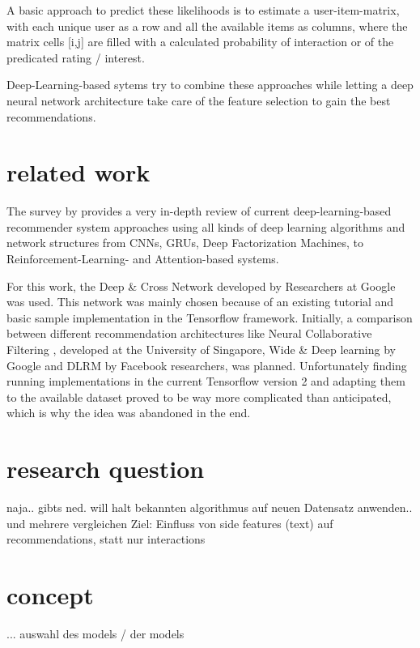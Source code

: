 \documentclass[10pt,final,journal,a4paper,oneside,twocolumn]{IEEEtran}
\begin{document}

A basic approach to predict these likelihoods is to estimate a user-item-matrix, with each unique user as a row and all the available items as columns, where the matrix cells [i,j] are filled with a calculated probability of interaction or of the predicated rating / interest. 

Deep-Learning-based sytems try to combine these approaches while letting a deep neural network architecture take care of the feature selection to gain the best recommendations.

\section{related work}
The survey \cite{Zhang.2020} by \citeauthor{Zhang.2020} provides a very in-depth review of current deep-learning-based recommender system approaches using all kinds of deep learning algorithms and network structures from CNNs, GRUs, Deep Factorization Machines, to Reinforcement-Learning- and Attention-based systems.

For this work, the Deep \& Cross Network \cite{Wang.2017} \cite{Wang.2021} developed by Researchers at Google was used. This network was mainly chosen because of an existing tutorial and basic sample implementation in the Tensorflow framework.
Initially, a comparison between different recommendation architectures like Neural Collaborative Filtering \cite{He.2017}, developed at the University of Singapore, Wide \& Deep learning \cite{Cheng.2016} by Google and DLRM \cite{Naumov.31.05.2019} by Facebook researchers, was planned. Unfortunately finding running implementations in the current Tensorflow version 2 and adapting them to the available dataset proved to be way more complicated than anticipated, which is why the idea was abandoned in the end.

\section{research question}
naja.. gibts ned. will halt bekannten algorithmus auf neuen Datensatz anwenden.. und mehrere vergleichen
Ziel: Einfluss von side features (text) auf recommendations, statt nur interactions
\section{concept}
...
auswahl des models / der models
\end{document}

